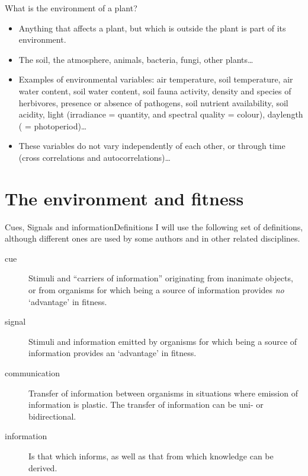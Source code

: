 \documentclass[10pt]{beamer}
\begin{document}
\begin{frame}{What is the environment of a plant?}
    \begin{itemize}
        \item Anything that affects a plant, but which is outside
        the plant is part of its environment.
        \item The soil, the atmosphere, animals, bacteria, fungi,
        other plants\ldots
        \item Examples of environmental variables: air temperature,
        soil temperature, air water content, soil water content,
        soil fauna activity, density and species of herbivores,
        presence or absence of pathogens, soil nutrient
        availability, soil acidity, light (irradiance = quantity, and spectral quality = colour), daylength ( = photoperiod)\ldots
        \item These variables do not vary independently of each other, or through time (cross correlations and autocorrelations)\ldots
    \end{itemize}
\end{frame}

\section{The environment and fitness}

\begin{frame}{Cues, Signals and information}{Definitions}
I will use the following set of definitions, although different ones are used by some authors and in other related disciplines.
  \begin{description}
     \item[cue] Stimuli and ``carriers of information'' originating from inanimate objects, or from organisms for which being a source of information provides \emph{no} `advantage' in fitness.
     \item[signal] Stimuli and information emitted by organisms for which being a source of information provides an `advantage' in fitness.
     \item[communication] Transfer of information between organisms in situations where emission of information is plastic. The transfer of information can be uni- or bidirectional.
     \item[information] Is that which informs, as well as that from which knowledge can be derived.
  \end{description}
\end{frame}
\end{document}
